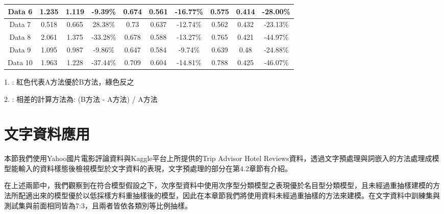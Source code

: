 \begin{table}[H]
{\begin{threeparttable}
\begin{tabular}{cccccccccc}
\multicolumn{1}{c|}{Data 6}  & 1.235 & 1.119 & \multicolumn{1}{c|}{{\color[HTML]{009901} -9.39\%}}  & 0.674 & 0.561 & \multicolumn{1}{c|}{{\color[HTML]{FE0000} -16.77\%}} & 0.575 & 0.414 & {\color[HTML]{FE0000} -28.00\%} \\ \hline
\multicolumn{1}{c|}{Data 7}  & 0.518 & 0.665 & \multicolumn{1}{c|}{{\color[HTML]{FE0000} 28.38\%}}  & 0.73  & 0.637 & \multicolumn{1}{c|}{{\color[HTML]{FE0000} -12.74\%}} & 0.562 & 0.432 & {\color[HTML]{FE0000} -23.13\%} \\ \hline
\multicolumn{1}{c|}{Data 8}  & 2.061 & 1.375 & \multicolumn{1}{c|}{{\color[HTML]{009901} -33.28\%}} & 0.678 & 0.588 & \multicolumn{1}{c|}{{\color[HTML]{FE0000} -13.27\%}} & 0.765 & 0.421 & {\color[HTML]{FE0000} -44.97\%} \\ \hline
\multicolumn{1}{c|}{Data 9}  & 1.095 & 0.987 & \multicolumn{1}{c|}{{\color[HTML]{009901} -9.86\%}}  & 0.647 & 0.584 & \multicolumn{1}{c|}{{\color[HTML]{FE0000} -9.74\%}}  & 0.639 & 0.48  & {\color[HTML]{FE0000} -24.88\%} \\ \hline
\multicolumn{1}{c|}{Data 10} & 1.963 & 1.228 & \multicolumn{1}{c|}{{\color[HTML]{009901} -37.44\%}} & 0.709 & 0.604 & \multicolumn{1}{c|}{{\color[HTML]{FE0000} -14.81\%}} & 0.788 & 0.425 & {\color[HTML]{FE0000} -46.07\%} \\ \hline
\end{tabular}

\begin{tablenotes}  
        \item[1.] :  紅色代表A方法優於B方法，綠色反之
        \item[2.] :  相差的計算方法為: (B方法 - A方法) / A方法
\end{tablenotes}
\end{threeparttable}
}\end{table}


\section{文字資料應用}
	
	本節我們使用Yahoo國片電影評論資料與Kaggle平台上所提供的Trip Advisor Hotel Reviews資料，透過文字預處理與詞嵌入的方法處理成模型能輸入的資料樣態後檢視模型於文字資料的表現，文字預處理的部分在第4.2章節有介紹。
	
	在上述兩節中，我們觀察到在符合模型假設之下，次序型資料中使用次序型分類模型之表現優於名目型分類模型，且未經過重抽樣建模的方法所配適出來的模型優於以低採樣方料重抽樣後的模型，因此在本章節我們將使用資料未經過重抽樣的方法來建模。在文字資料中訓練集與測試集與前面相同皆為7:3，且兩者皆依各類別等比例抽樣。
	
